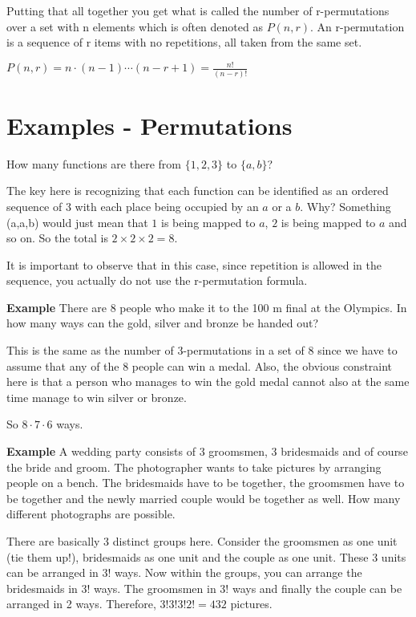 \documentclass[12pt]{article}
\begin{document}
Putting that all together you get what is called the number of r-permutations over a set with n elements which is often denoted as $P(n,r)$. An r-permutation is a sequence of r items with no repetitions, all taken from the same set.

$P(n,r) = n \cdot (n-1) \cdots (n-r+1) = \frac{n!}{(n-r)!}$

\section*{Examples -  Permutations}

How many functions are there from $\{1,2,3\}$ to $\{a,b\}$?

The key here is recognizing that each function can be identified as an ordered sequence of 3 with each place being occupied by an $a$ or a $b$. Why? Something (a,a,b) would just mean that $1$ is being mapped to $a$, $2$ is being mapped to $a$ and so on. 
So the total is $2 \times 2 \times 2 = 8$. 

It is important to observe that in this case, since repetition is allowed in the sequence, you actually do not use the r-permutation formula. 

\medskip

\textbf{Example} There are 8 people who make it to the 100 m final at the Olympics. In how many ways can the gold, silver and bronze be handed out?

This is the same as the number of 3-permutations in a set of 8 since we have to assume that any of the 8 people can win a medal. Also, the obvious constraint here is that a person who manages to win the gold medal cannot also at the same time manage to win silver or bronze. 

So $8 \cdot 7 \cdot 6$  ways.

\medskip

\textbf{Example} A wedding party consists of 3 groomsmen, 3 bridesmaids and of course the bride and groom. The photographer wants to take pictures by arranging people on a bench. The bridesmaids have to be together, the groomsmen have to be together and the newly married couple would be together as well. How many different photographs are possible.

There are basically 3 distinct groups here. Consider the groomsmen as one unit (tie them up!), bridesmaids as one unit and the couple as one unit. These 3 units can be arranged in 3! ways. Now within the groups, you can arrange the bridesmaids in 3! ways. The groomsmen in 3! ways and finally the couple can be arranged in 2 ways.
Therefore, $3!3!3!2! = 432$ pictures. 
\end{document}
